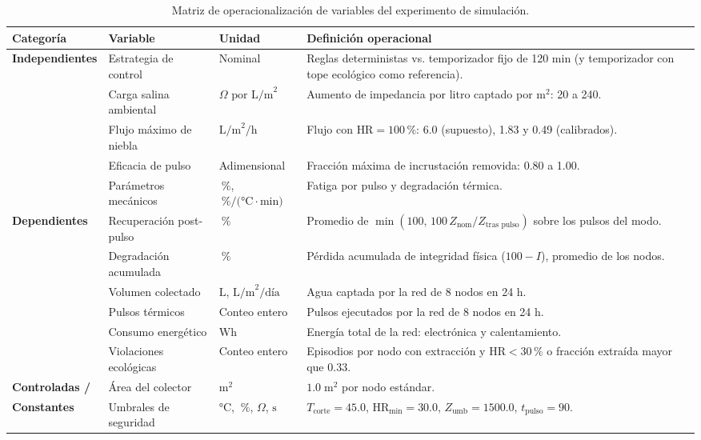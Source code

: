 \begin{table}[htbp]
\centering
\small
\caption{Matriz de operacionalizaci\'on de variables del experimento de simulaci\'on.}
\label{tab:operacionalizacion}
\begin{tabularx}{\textwidth}{@{}L{3.2cm}L{3.8cm}L{2.5cm}Y@{}}
\toprule
\textbf{Categor\'ia} & \textbf{Variable} & \textbf{Unidad} & \textbf{Definici\'on operacional} \\
\midrule
\textbf{Independientes} & Estrategia de control & Nominal & Reglas deterministas vs. temporizador fijo de 120 min (y temporizador con tope ecol\'ogico como referencia). \\
& Carga salina ambiental & $\Omega\text{ por L/m}^2$ & Aumento de impedancia por litro captado por m$^2$: 20 a 240. \\
& Flujo m\'aximo de niebla & $\text{L/m}^2\text{/h}$ & Flujo con $\text{HR}=100\,\%$: 6.0 (supuesto), 1.83 y 0.49 (calibrados). \\
& Eficacia de pulso & Adimensional & Fracci\'on m\'axima de incrustaci\'on removida: 0.80 a 1.00. \\
& Par\'ametros mec\'anicos & $\SI{}{\percent}$, $\SI{}{\percent\per(\celsius\cdot\minute)}$ & Fatiga por pulso y degradaci\'on t\'ermica. \\
\midrule
\textbf{Dependientes} & Recuperaci\'on post-pulso & $\SI{}{\percent}$ & Promedio de $\min(100,\,100\,Z_{\text{nom}}/Z_{\text{tras pulso}})$ sobre los pulsos del modo. \\
& Degradaci\'on acumulada & $\SI{}{\percent}$ & P\'erdida acumulada de integridad f\'isica ($100 - I$), promedio de los nodos. \\
& Volumen colectado & $\text{L}$, $\text{L/m}^2\text{/d\'ia}$ & Agua captada por la red de 8 nodos en 24 h. \\
& Pulsos t\'ermicos & Conteo entero & Pulsos ejecutados por la red de 8 nodos en 24 h. \\
& Consumo energ\'etico & $\text{Wh}$ & Energ\'ia total de la red: electr\'onica y calentamiento. \\
& Violaciones ecol\'ogicas & Conteo entero & Episodios por nodo con extracci\'on y $\text{HR}<30\,\%$ o fracci\'on extra\'ida mayor que 0.33. \\
\midrule
\textbf{Controladas /} & \'Area del colector & $\text{m}^2$ & $1.0\;\text{m}^2$ por nodo est\'andar. \\
\textbf{Constantes} & Umbrales de seguridad & $\si{\celsius}$, $\SI{}{\percent}$, $\Omega$, $\text{s}$ & $T_{\text{corte}}=45.0$, $\text{HR}_{\text{min}}=30.0$, $Z_{\text{umb}}=1500.0$, $t_{\text{pulso}}=90$. \\
\bottomrule
\end{tabularx}
\end{table}

